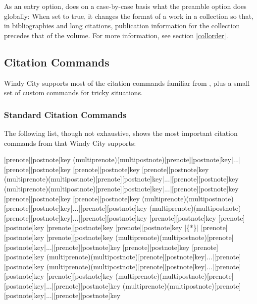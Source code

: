\documentclass[11pt,letterpaper,oneside]{article}
\begin{document}
\begin{optionlist}

\noindent As an entry option,  does on a case-by-case
basis what the  preamble option does globally: When set
to true, it changes the format of a work in a collection so that, in
bibliographies and long citations, publication information for the
collection precedes that of the volume. For more information, see
section \ref{collorder}.

\end{optionlist}

\subsection{Citation Commands}

Windy City supports most of the citation commands familiar from
\biblatex, plus a small set of custom commands for tricky situations.

\subsubsection{Standard Citation Commands}
\label{std.cmd}

The following list, though not exhaustive, shows the most important
citation commands from \biblatex that Windy City supports:

\begin{ltxsyntax}
[prenote][postnote]{key}
(multiprenote)(multipostnote)[prenote][postnote]{key}|...|[prenote][postnote]{key}
[prenote][postnote]{key}
[prenote][postnote]{key}
(multiprenote)(multipostnote)[prenote][postnote]{key}|...|[prenote][postnote]{key}
(multiprenote)(multipostnote)[prenote][postnote]{key}|...|[prenote][postnote]{key}
[prenote][postnote]{key}
[prenote][postnote]{key}
(multiprenote)(multipostnote)[prenote][postnote]{key}|...|[prenote][postnote]{key}
(multiprenote)(multipostnote)[prenote][postnote]{key}|...|[prenote][postnote]{key}
[prenote][postnote]{key}
[prenote][postnote]{key}
[prenote][postnote]{key}
[prenote][postnote]{key}
|\{*\}|
[prenote][postnote]{key}
[prenote][postnote]{key}
(multiprenote)(multipostnote)[prenote][postnote]{key}|...|[prenote][postnote]{key}
[prenote][postnote]{key}
[prenote][postnote]{key}
(multiprenote)(multipostnote)[prenote][postnote]{key}|...|[prenote][postnote]{key}
(multiprenote)(multipostnote)[prenote][postnote]{key}|...|[prenote][postnote]{key}
[prenote][postnote]{key}
(multiprenote)(multipostnote)[prenote][postnote]{key}|...|[prenote][postnote]{key}
(multiprenote)(multipostnote)[prenote][postnote]{key}|...|[prenote][postnote]{key}
\end{ltxsyntax}
\end{document}
